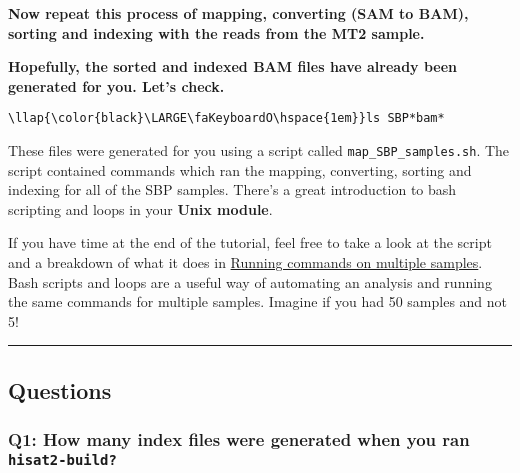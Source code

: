 \documentclass[11pt]{article}
\begin{document}
    \textbf{Now repeat this process of mapping, converting (SAM to BAM),
sorting and indexing with the reads from the MT2 sample.}

    \textbf{Hopefully, the sorted and indexed BAM files have already been
generated for you. Let's check.}





\begin{terminalinput}
\begin{Verbatim}[commandchars=\\\{\}]
\llap{\color{black}\LARGE\faKeyboardO\hspace{1em}}ls SBP*bam*
\end{Verbatim}
\end{terminalinput}



    These files were generated for you using a script called
\texttt{map\_SBP\_samples.sh}. The script contained commands which ran
the mapping, converting, sorting and indexing for all of the SBP
samples. There's a great introduction to bash scripting and loops in
your \textbf{Unix module}.

If you have time at the end of the tutorial, feel free to take a look at
the script and a breakdown of what it does in
\href{running-commands-on-multiple-samples.ipynb}{Running commands on
multiple samples}. Bash scripts and loops are a useful way of automating
an analysis and running the same commands for multiple samples. Imagine
if you had 50 samples and not 5!

    \begin{center}\rule{0.5\linewidth}{.4pt}\end{center}

    \hypertarget{questions}{%
\subsection{Questions}\label{questions}}

    \hypertarget{q1-how-many-index-files-were-generated-when-you-ran-hisat2-build}{%
\subsubsection{\texorpdfstring{Q1: How many index files were generated
when you ran
\texttt{hisat2-build?}}{Q1: How many index files were generated when you ran hisat2-build?}}\label{q1-how-many-index-files-were-generated-when-you-ran-hisat2-build}}
\end{document}
